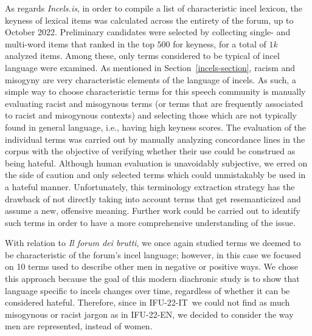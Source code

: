 \documentclass[11pt]{article}
\newcommand{\dsENcorpus}{IFU-22-EN}
\newcommand{\dsITcorpus}{IFU-22-IT}
\newcommand{\enforum}{\textit{Incels.is}}
\newcommand{\itforum}{\textit{Il forum dei brutti}}
\begin{document}
As regards \enforum, in order to compile a list of characteristic incel lexicon, the keyness of lexical items was calculated across the entirety of the forum, up to October 2022. Preliminary candidates were selected by 
collecting single- and multi-word items that ranked in the top $500$ for keyness, for a total of $1k$ analyzed items.  Among these, only terms considered to be typical of incel language were examined. As mentioned in Section~\ref{incels-section}, racism and misogyny are very characteristic elements of the language of incels. As such, a simple way to choose characteristic terms for this speech community is manually evaluating racist and misogynous terms (or terms that are frequently associated to racist and misogynous contexts) and selecting those which are not typically found in general language, i.e., having high keyness scores.
The evaluation of the individual terms was carried out by manually analyzing concordance lines in the corpus with the objective of verifying whether their use could be construed as being hateful. Although human evaluation is unavoidably subjective, we erred on the side of caution and only selected terms which could unmistakably be used in a hateful manner. Unfortunately, this terminology extraction strategy has the drawback of not directly taking into account terms that get resemanticized and assume a new, offensive meaning. Further work could be carried out to identify such terms in order to have a more comprehensive understanding of the issue.

With relation to \itforum, we once again studied terms we deemed to be characteristic of the forum's incel language; however, in this case we focused on 10 terms used to describe other men in negative or positive ways. We chose this approach because the goal of this modern diachronic study is to show that language specific to incels changes over time, regardless of whether it can be considered hateful. Therefore, since in \dsITcorpus\, we could not find as much misogynous or racist jargon as in \dsENcorpus, we decided to consider the way men are represented, instead of women.

\end{document}
